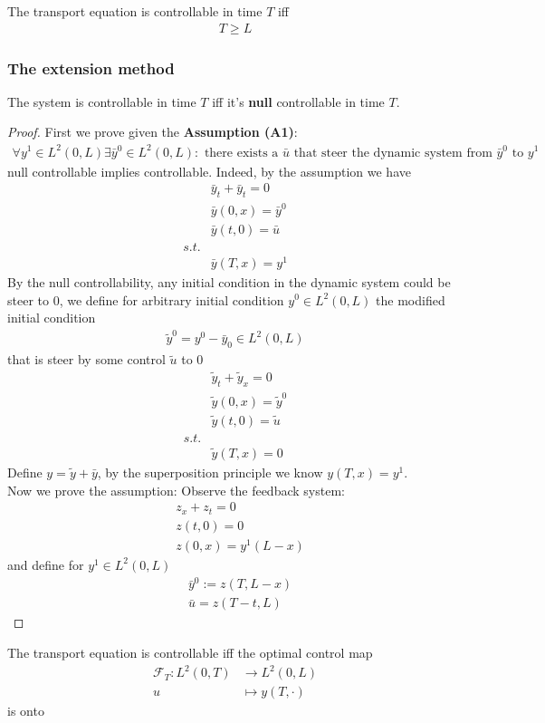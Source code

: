 \begin{theorem}
	The transport equation is controllable in time $T$ iff
	\begin{align*}
		T \geq L
	\end{align*}
\end{theorem}

\subsubsection*{The extension method}
\begin{lemma}
	The system is controllable in time $T$ iff it's \textbf{null} controllable in time $T$. 
\end{lemma}
\begin{proof}
	First we prove given the \textbf{Assumption (A1)}:
	\begin{align*}
		\forall y^1 \in L^2(0, L) \exists \bar{y}^0 \in L^2(0, L): \text{ there exists a $\bar{u}$ that steer the dynamic system from $\bar{y}^0$ to $y^1$ }
	\end{align*}
	null controllable implies controllable. Indeed, by the assumption we have
	\begin{align*}
		& \bar{y}_t + \bar{y}_t = 0\\
		& \bar{y}(0, x) = \bar{y}^0 \\
		& \bar{y}(t, 0) = \bar{u}\\
		s.t.\\
		& \bar{y}(T, x) = y^1
	\end{align*}
	By the null controllability, any initial condition in the dynamic system could be steer to $0$, we define for arbitrary initial condition $y^0 \in L^2(0, L)$ the modified initial condition 
	\begin{align*}
		\tilde{y}^0 = y^0 - \bar{y}_0 \in L^2(0, L)
	\end{align*}
	that is steer by some control $\tilde{u}$ to $0$
	\begin{align*}
		& \tilde{y}_t + \tilde{y}_x = 0\\
		& \tilde{y}(0, x) = \tilde{y}^0\\
		& \tilde{y}(t, 0) = \tilde{u}\\
		s.t.\\
		& \tilde{y}(T, x) = 0
	\end{align*}
	Define $y = \tilde{y} + \bar{y}$, by the superposition principle we know $y(T, x) = y^1$. \\
	Now we prove the assumption:
	Observe the feedback system:
	\begin{align*}
		& z_x + z_t = 0\\
		& z(t, 0) = 0\\
		& z(0, x) = y^1(L - x)
	\end{align*}
	and define for $y^1 \in L^2(0, L)$ 
	\begin{align*}
		& \bar{y}^0 := z(T, L - x)\\
		& \bar{u} = z(T - t, L)
	\end{align*}
\end{proof}


\begin{lemma}
	The transport equation is controllable iff the optimal control map
	\begin{align*}
		\mathcal{F}_T: L^2(0, T) &\rightarrow L^2(0, L) \\
		u &\mapsto y(T, \cdot)
	\end{align*}
	is onto
\end{lemma}
